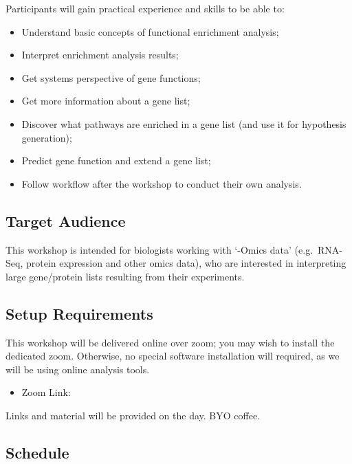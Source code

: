 \documentclass[
]{book}
\providecommand{\tightlist}{%
  \setlength{\itemsep}{0pt}\setlength{\parskip}{0pt}}
\begin{document}
Participants will gain practical experience and skills to be able to:

\begin{itemize}
\tightlist
\item
  Understand basic concepts of functional enrichment analysis;
\item
  Interpret enrichment analysis results;
\item
  Get systems perspective of gene functions;
\item
  Get more information about a gene list;
\item
  Discover what pathways are enriched in a gene list (and use it for hypothesis generation);
\item
  Predict gene function and extend a gene list;
\item
  Follow workflow after the workshop to conduct their own analysis.
\end{itemize}

\hypertarget{target-audience}{%
\subsection{Target Audience}\label{target-audience}}

This workshop is intended for biologists working with `-Omics data' (e.g.~RNA-Seq, protein expression and other omics data), who are interested in interpreting large gene/protein lists resulting from their experiments.

\hypertarget{setup-requirements}{%
\subsection{Setup Requirements}\label{setup-requirements}}

This workshop will be delivered online over zoom; you may wish to install the dedicated zoom. Otherwise, no special software installation will required, as we will be using online analysis tools.

\begin{itemize}
\tightlist
\item
  Zoom Link:
\end{itemize}

Links and material will be provided on the day. BYO coffee.

\hypertarget{schedule}{%
\subsection{Schedule}\label{schedule}}
\end{document}
